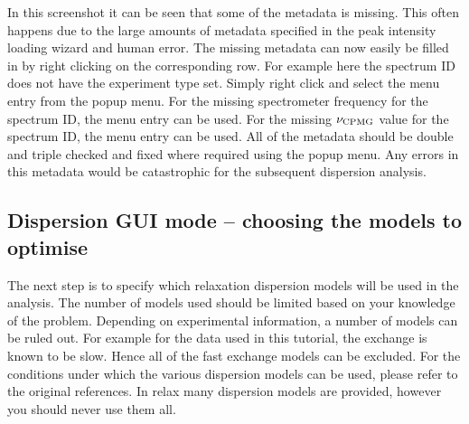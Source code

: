 In this screenshot it can be seen that some of the metadata is missing.
This often happens due to the large amounts of metadata specified in the peak intensity loading wizard and human error.
The missing metadata can now easily be filled in by right clicking on the corresponding row.
For example here the  spectrum ID does not have the experiment type set.
Simply right click and select the  menu entry from the popup menu.
For the missing spectrometer frequency for the  spectrum ID, the  menu entry can be used.
For the missing $\nu_{\textrm{CPMG}}$ value for the  spectrum ID, the  menu entry can be used.
All of the metadata should be double and triple checked and fixed where required using the popup menu.
Any errors in this metadata would be catastrophic for the subsequent dispersion analysis.



\subsection{Dispersion GUI mode -- choosing the models to optimise}

The next step is to specify which relaxation dispersion models will be used in the analysis.
The number of models used should be limited based on your knowledge of the problem.
Depending on experimental information, a number of models can be ruled out.
For example for the data used in this tutorial, the exchange is known to be slow.
Hence all of the fast exchange models can be excluded.
For the conditions under which the various dispersion models can be used, please refer to the original references.
In relax many dispersion models are provided, however you should never use them all.

